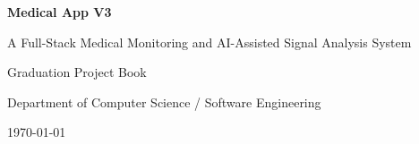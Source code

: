 \documentclass[12pt,oneside]{book}
\begin{document}
\begin{titlepage}
    \centering
    \vspace*{1.5cm}
    {\Huge\bfseries Medical App V3\par}
    \vspace{0.5cm}
    {\Large A Full-Stack Medical Monitoring and AI-Assisted Signal Analysis System\par}
    \vspace{1.5cm}
    {\large Graduation Project Book\par}
    \vfill
    {\large Department of Computer Science / Software Engineering\par}
    {\large \today\par}
\end{titlepage}

\frontmatter
\tableofcontents
\listoffigures
\listoftables



\mainmatter
















\backmatter


\end{document}
